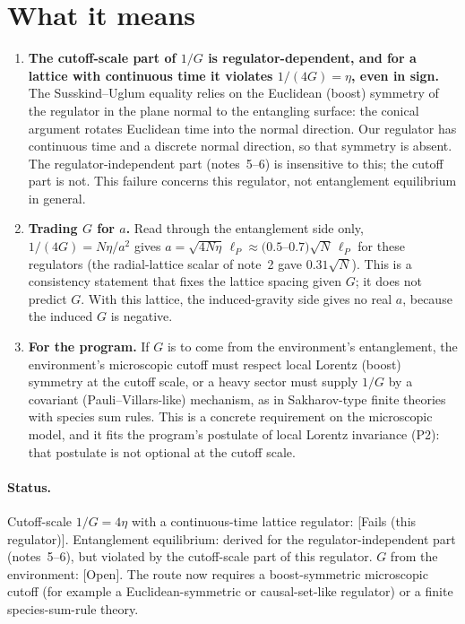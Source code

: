 \documentclass[11pt]{article}
\newcommand{\st}[1]{\textsf{\small[#1]}}
\begin{document}
\section{What it means}
\begin{enumerate}
\item \textbf{The cutoff-scale part of $1/G$ is regulator-dependent, and for a lattice with continuous time it violates $1/(4G)=\eta$, even in sign.} The Susskind--Uglum equality relies on the Euclidean (boost) symmetry of the regulator in the plane normal to the entangling surface: the conical argument rotates Euclidean time into the normal direction. Our regulator has continuous time and a discrete normal direction, so that symmetry is absent. The regulator-independent part (notes~5--6) is insensitive to this; the cutoff part is not. This failure concerns this regulator, not entanglement equilibrium in general.
\item \textbf{Trading $G$ for $a$.} Read through the entanglement side only, $1/(4G)=N\eta/a^2$ gives $a=\sqrt{4N\eta}\,\ell_P\approx(0.5$--$0.7)\sqrt N\,\ell_P$ for these regulators (the radial-lattice scalar of note~2 gave $0.31\sqrt N$). This is a consistency statement that fixes the lattice spacing given $G$; it does not predict $G$. With this lattice, the induced-gravity side gives no real $a$, because the induced $G$ is negative.
\item \textbf{For the program.} If $G$ is to come from the environment's entanglement, the environment's microscopic cutoff must respect local Lorentz (boost) symmetry at the cutoff scale, or a heavy sector must supply $1/G$ by a covariant (Pauli--Villars-like) mechanism, as in Sakharov-type finite theories with species sum rules. This is a concrete requirement on the microscopic model, and it fits the program's postulate of local Lorentz invariance (P2): that postulate is not optional at the cutoff scale.
\end{enumerate}

\paragraph{Status.} Cutoff-scale $1/G=4\eta$ with a continuous-time lattice regulator: \st{Fails (this regulator)}. Entanglement equilibrium: derived for the regulator-independent part (notes~5--6), but violated by the cutoff-scale part of this regulator. $G$ from the environment: \st{Open}. The route now requires a boost-symmetric microscopic cutoff (for example a Euclidean-symmetric or causal-set-like regulator) or a finite species-sum-rule theory.
\end{document}
